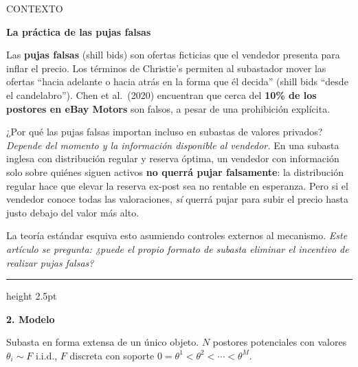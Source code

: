 \documentclass[20pt]{extarticle}
\renewcommand{\small}{\fontsize{20}{25}\selectfont}
\newcommand{\slbl}[1]{\par\noindent\begingroup\raggedright\fontsize{20}{24}\selectfont\color{muted}\MakeUppercase{#1}\par\endgroup\vspace{2mm}}
\newcommand{\stit}[1]{{\fontsize{38}{46}\selectfont\color{ink}\textbf{#1}}}
\newcommand{\shr}{{\vspace{12mm}\color{rulegray}\hrule height 2.5pt\vspace{12mm}}}
\begin{document}
\vspace{15mm}
\noindent\hspace{3cm}%
\begin{minipage}[t]{47cm}


  \slbl{Contexto}
  \stit{La práctica de las pujas falsas}

  \vspace{3mm}
  \begin{tcolorbox}[shaded]
    \small\justifying
    Las \textbf{pujas falsas} (shill bids) son ofertas ficticias que el vendedor presenta para inflar el precio.
    Los términos de Christie's permiten al subastador mover las ofertas ``hacia adelante o hacia atrás en la forma que él decida'' (shill bids ``desde el candelabro'').
    Chen et al.\ (2020) encuentran que cerca del \textbf{10\% de los postores en eBay Motors} son falsos, a pesar de una prohibición explícita.

    \medskip
    ¿Por qué las pujas falsas importan incluso en subastas de valores privados? \emph{Depende del momento y la información disponible al vendedor.} En una subasta inglesa con distribución regular y reserva óptima, un vendedor con información solo sobre quiénes siguen activos \textbf{no querrá pujar falsamente}: la distribución regular hace que elevar la reserva ex-post sea no rentable en esperanza. Pero si el vendedor conoce todas las valoraciones, \emph{sí} querrá pujar para subir el precio hasta justo debajo del valor más alto.

    \medskip
    La teoría estándar esquiva esto asumiendo controles externos al mecanismo.
    \emph{Este artículo se pregunta: ¿puede el propio formato de subasta eliminar el incentivo de realizar pujas falsas?}
  \end{tcolorbox}

  \shr

  \stit{2. Modelo}

  \vspace{3mm}
  {\small\justifying
    Subasta en forma extensa de un único objeto. $N$ postores potenciales con valores $\theta_i\!\sim\! F$ i.i.d., $F$ discreta con soporte $0=\theta^1<\theta^2<\cdots<\theta^M$.}


\end{minipage}
\end{document}
